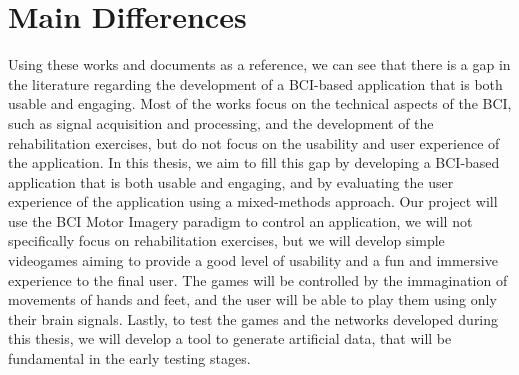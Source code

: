 \section{Main Differences}
Using these works and documents as a reference, we can see that there is a gap in the literature regarding the development of a BCI-based application that is both usable and engaging.
Most of the works focus on the technical aspects of the BCI, such as signal acquisition and processing, and the development of the rehabilitation exercises, but do not focus on the usability and user experience of the application.
In this thesis, we aim to fill this gap by developing a BCI-based application that is both usable and engaging, and by evaluating the user experience of the application using a mixed-methods approach.
Our project will use the BCI Motor Imagery paradigm to control an application, we will not specifically focus on rehabilitation exercises, but we will develop simple videogames aiming to provide a good level of usability and a fun and immersive experience to the final user.
The games will be controlled by the immagination of movements of hands and feet, and the user will be able to play them using only their brain signals.
Lastly, to test the games and the networks developed during this thesis, we will develop a tool to generate artificial data, that will be fundamental in the early testing stages.
